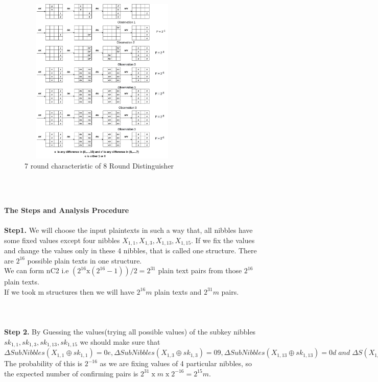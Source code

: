 \begin{frame}

\begin{figure}[h!]
    \centering
    \includegraphics[width= 8cm, height= 8cm, keepaspectratio]{images/7round characteristic of round reduced.jpg}
    \caption{7 round characteristic of 8 Round Distinguisher}
    \label{fig:6distinguisher}
\end{figure}
\\ \\
\end{frame}
\begin{frame}
\textbf{ The Steps and Analysis Procedure}\\ \\
\textbf{Step1.} We will choose the input plaintexts in such a way that, all nibbles have some fixed values except four nibbles $X_{1,1} , X_{1,3} , X_{1,13} , X_{1,15}$. If we fix the values and change the values only in these 4 nibbles, that is called one structure. There are $2^{16}$ possible plain texts in one structure.\\
We can form nC2 i.e $(2^{16} \text{x} (2^{16} - 1))/2 = 2^{31}$ plain text pairs from those $2^{16} $ plain texts.\\ If we took m structures then we will have $2^{16}m$ plain texts and $2^{31}m$ pairs.\\ \\ \\ \\
\textbf{Step 2.} By Guessing the values(trying all possible values)  of the subkey nibbles $sk_{1,1} , sk_{1,3} , sk_{1,13} , sk_{1,15}$ we should make sure that $\Delta SubNibbles(X_{1,1} \oplus sk_{1,1} ) = 0e, \Delta SubNibbles(X_{1,3} \oplus sk_{1,3} ) = 09, \Delta SubNibbles(X_{1,13} \oplus sk_{1,13} ) =
0d\; and \;\Delta S(X_{1,15} \oplus sk_{1,15} ) = 0b.$ The probability of this is $2^{-16}$ as we are fixing values of 4 particular nibbles, so the expected number of confirming pairs is $2^{31} \;\text{x}\; m\; \text{x} \;2^{-16} = 2^{15} m$. 

\end{frame}
